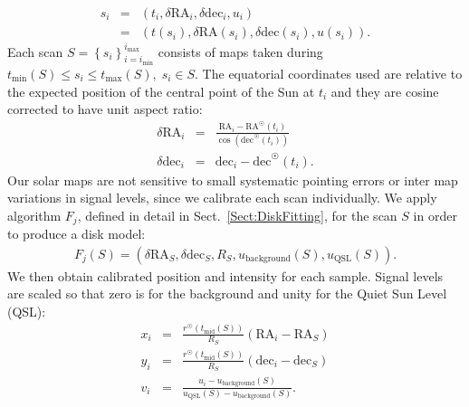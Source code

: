 \documentclass{aa}
\newcommand{\eqnl}[2]{\begin{eqnarray}\label{#1}#2\end{eqnarray}}
\newcommand{\s}[2]{{#1}_{\mathrm{#2}}}
\begin{document}
\eqnl{radio_sample}{
s_i &=& 
\left( t_i, \delta \mathrm{RA}_i, \delta \mathrm{dec}_i, u_i \right) \\ \nonumber
&=& \left( t(s_i), \delta \mathrm{RA}(s_i), \delta \mathrm{dec}(s_i), u(s_i) \right) \text{.}
}
Each scan $S = \left\{ s_i \right\}_{i=\s{i}{min}}^{\s{i}{max}}$ consists of maps taken 
during $\s{t}{min}(S) \le s_i \le \s{t}{max}(S), \; s_i \in S$.
The equatorial coordinates used are relative to the expected position of the central point
of the Sun at $t_i$ and they are cosine corrected to have unit aspect ratio:
\eqnl{relative_radec}{
\delta \mathrm{RA}_i  &=& \frac{\mathrm{RA}_i - \mathrm{RA}^{\astrosun}(t_i)}{\cos \left( \mathrm{dec}^{\astrosun}(t_i) \right)} \\
\delta \mathrm{dec}_i &=& \mathrm{dec}_i - \mathrm{dec}^{\astrosun}(t_i) \text{.}
}
Our solar maps are not sensitive to small systematic pointing errors or inter map variations in signal levels, since we calibrate each scan individually.
We apply algorithm $F_j$,
defined in detail in Sect.~\ref{Sect:DiskFitting},
for the scan $S$ in order to produce a disk model:
\eqnl{disk_model}{
F_j(S) = \left( \delta \mathrm{RA}_S, \delta \mathrm{dec}_S, R_S, \s{u}{background}(S), \s{u}{QSL}(S) \right) \text{.}
}
We then obtain calibrated position and intensity for each sample. Signal levels are scaled so that zero is for the background and unity for the Quiet Sun Level (QSL):
\eqnl{calibration}{
x_i &=& \frac{r^{\astrosun} \left( \s{t}{mid}(S) \right)}{R_S} \left( \mathrm{RA}_i -  \mathrm{RA}_S  \right) \\
y_i &=& \frac{r^{\astrosun} \left( \s{t}{mid}(S) \right)}{R_S} \left( \mathrm{dec}_i - \mathrm{dec}_S \right) \\
v_i &=& \frac{u_i - \s{u}{background}(S)}{\s{u}{QSL}(S) - \s{u}{background}(S)} \text{.}
}
\end{document}
